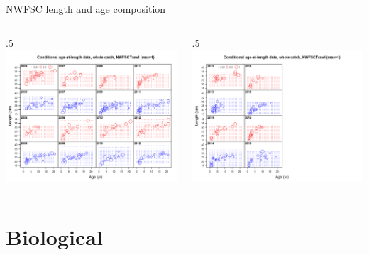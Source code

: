 \documentclass[ignorenonframetext,]{beamer}
\def\begincols{\begin{columns}}
\def\begincol{\begin{column}}
\def\endcol{\end{column}}
\def\endcols{\end{columns}}
\begin{document}
\begin{frame}{NWFSC length and age composition}

\begincols
 \begincol{.5\textwidth}
\includegraphics[height=.5\textheight]{r4ss/plots_mod1/comp_condAALdat_bubflt8mkt0_page1.png}
\endcol
 \begincol{.5\textwidth}
\includegraphics[height=.5\textheight]{r4ss/plots_mod1/comp_condAALdat_bubflt8mkt0_page2.png}
\endcol
\endcols

\end{frame}

\section{Biological}\label{biological}
\end{document}
